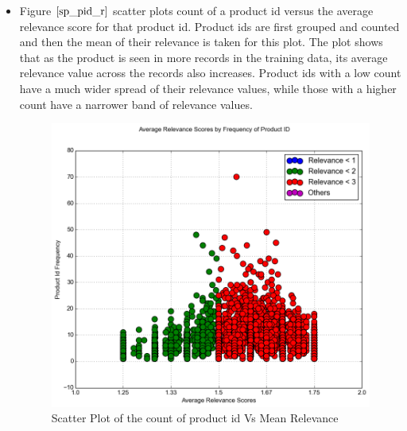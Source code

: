 \documentclass[twoside,12pt]{article}
\begin{document}
\begin{itemize}
\FloatBarrier
\item 
Figure $\eqref{sp_pid_r}$ scatter plots count of a product id versus the average relevance score for that product id. Product ids are first grouped and counted and then the mean of their relevance is taken for this plot. The plot shows that as the product is seen in more records in the training data, its average relevance value across the records also increases. Product ids with a low count have a much wider spread of their relevance values, while those with a higher count have a narrower band of relevance values.
\FloatBarrier
\begin{figure}[!htbp]
	\centering
	\includegraphics[scale=.43]{DataVisualization/pid_relv_cnt_plot.png} 
	\caption{Scatter Plot of the count of product id Vs Mean Relevance}
	\label{sp_pid_r}
\end{figure}


\end{itemize}
\end{document}
